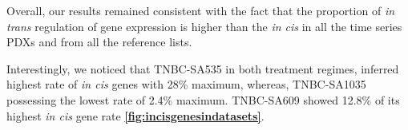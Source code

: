  Overall, our results remained consistent with the fact that the proportion of \textit{in trans} regulation of gene expression is higher than the \textit{in cis} in all the time series PDXs and from all the reference lists.   
 
 Interestingly, we noticed that TNBC-SA535 in both treatment regimes, inferred highest rate of \textit{in cis} genes with 28\% maximum, whereas, TNBC-SA1035 possessing the lowest rate of 2.4\% maximum. TNBC-SA609 showed 12.8\% of its highest \textit{in cis} gene rate \textbf{\autoref{fig:incisgenesindatasets}}.





